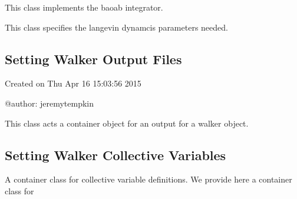 \documentclass[letterpaper,10pt,english]{sphinxmanual}
\begin{document}
\begin{fulllineitems}
\label{walker_api/walker_api.doc:dynamics.baoab}
This class implements the baoab integrator.

\end{fulllineitems}


\begin{fulllineitems}
\label{walker_api/walker_api.doc:dynamics.langevin}
This class specifies the langevin dynamcis parameters needed.

\end{fulllineitems}



\subsection{Setting Walker Output Files}
\label{walker_api/walker_api.doc:setting-walker-output-files}\label{walker_api/walker_api.doc:module-outputClass}
Created on Thu Apr 16 15:03:56 2015

@author: jeremytempkin

\begin{fulllineitems}
\label{walker_api/walker_api.doc:outputClass.outputClass}
This class acts a container object for an output for a walker object.

\end{fulllineitems}



\subsection{Setting Walker Collective Variables}
\label{walker_api/walker_api.doc:module-collectiveVariables}\label{walker_api/walker_api.doc:setting-walker-collective-variables}
A container class for collective variable definitions. We provide here a container class for
\end{document}

